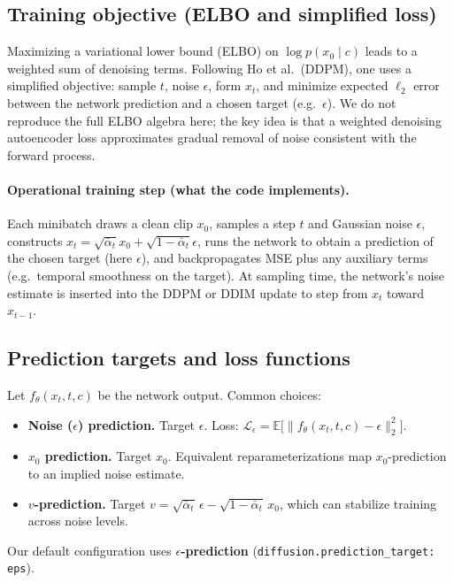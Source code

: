 \documentclass[11pt,a4paper]{article}
\begin{document}
\subsection{Training objective (ELBO and simplified loss)}
Maximizing a variational lower bound (ELBO) on $\log p(x_0\mid c)$ leads to a weighted sum of denoising terms.
Following Ho et al.\ (DDPM), one uses a simplified objective: sample $t$, noise $\epsilon$, form $x_t$, and minimize expected $\ell_2$ error between the network prediction and a chosen target (e.g.\ $\epsilon$).
We do not reproduce the full ELBO algebra here; the key idea is that a weighted denoising autoencoder loss approximates gradual removal of noise consistent with the forward process.

\paragraph{Operational training step (what the code implements).}
Each minibatch draws a clean clip $x_0$, samples a step $t$ and Gaussian noise $\epsilon$, constructs $x_t = \sqrt{\bar{\alpha}_t}x_0 + \sqrt{1-\bar{\alpha}_t}\epsilon$, runs the network to obtain a prediction of the chosen target (here $\epsilon$), and backpropagates MSE plus any auxiliary terms (e.g.\ temporal smoothness on the target).
At sampling time, the network's noise estimate is inserted into the DDPM or DDIM update to step from $x_t$ toward $x_{t-1}$.

\subsection{Prediction targets and loss functions}
Let $f_\theta(x_t, t, c)$ be the network output. Common choices:
\begin{itemize}
  \item \textbf{Noise ($\epsilon$) prediction.} Target $\epsilon$. Loss: $\mathcal{L}_\epsilon = \mathbb{E}\bigl[\| f_\theta(x_t,t,c) - \epsilon \|_2^2\bigr]$.
  \item \textbf{$x_0$ prediction.} Target $x_0$. Equivalent reparameterizations map $x_0$-prediction to an implied noise estimate.
  \item \textbf{$v$-prediction.} Target $v = \sqrt{\bar{\alpha}_t}\,\epsilon - \sqrt{1-\bar{\alpha}_t}\, x_0$, which can stabilize training across noise levels.
\end{itemize}
Our default configuration uses \textbf{$\epsilon$-prediction} (\texttt{diffusion.prediction\_target: eps}).
\end{document}
